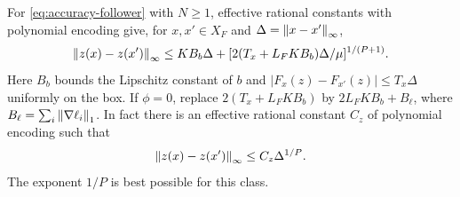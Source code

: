 \begin{proposition}
\label{prop:accuracy-response-modulus}
For \eqref{eq:accuracy-follower} with $N\ge1$, effective rational constants with
polynomial encoding give, for $x,x'\in X_F$ and
$\Delta=\left\lVert x-x'\right\rVert_\infty$,
\begin{equation}\label{eq:response-modulus-basic}
 \left\lVert z(x)-z(x')\right\rVert_\infty
 \le KB_b\Delta+
       [2(T_x+L_FKB_b)\Delta/\mu]^{1/(P+1)}.
\end{equation}
Here $B_b$ bounds the Lipschitz constant of $b$ and
$|F_x(z)-F_{x'}(z)|\le T_x\Delta$ uniformly on the box.
If $\phi=0$, replace $2(T_x+L_FKB_b)$ by
$2L_FKB_b+B_\ell$, where
$B_\ell=\sum_i\left\lVert\nabla\ell_i\right\rVert_1$.
In fact there is an effective rational constant $C_z$ of polynomial
encoding such that
\begin{equation}\label{eq:response-modulus-sharp}
                  \left\lVert z(x)-z(x')\right\rVert_\infty\le C_z\Delta^{1/P}.
\end{equation}
The exponent $1/P$ is best possible for this class.
\end{proposition}
